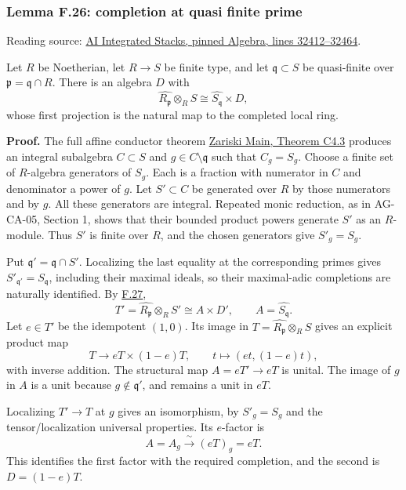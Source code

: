 \documentclass[11pt,a4paper,openany]{report}
\begin{document}
\subsubsection{Lemma F.26: completion at quasi finite prime}\label{AG-RG-S05-lemma-f.26-completion-at-quasi-finite-prime}

Reading source: \href{https://github.com/KokunoYumeto/unofficial-stacks-project-ai-drafts/blob/565b10e987aba5969b21145a0833f42d69f96790/algebra.tex\#L32412-L32464}{AI Integrated Stacks, pinned Algebra, lines 32412--32464}.

Let \(R\) be Noetherian, let \(R\to S\) be finite type, and let \(\mathfrak q\subset S\) be quasi-finite over \(\mathfrak p=\mathfrak q\cap R\). There is an algebra \(D\) with \[\widehat{R_{\mathfrak p}}\otimes_RS
\cong\widehat{S_{\mathfrak q}}\times D,\] whose first projection is the natural map to the completed local ring.

\textbf{Proof.} The full affine conductor theorem \href{https://github.com/KokunoYumeto/open-math-courses/blob/main/docs/courses/AG-RG/AG-RG-S04.md}{Zariski Main, Theorem C4.3} produces an integral subalgebra \(C\subset S\) and \(g\in C\setminus\mathfrak q\) such that \(C_g=S_g\). Choose a finite set of \(R\)-algebra generators of \(S_g\). Each is a fraction with numerator in \(C\) and denominator a power of \(g\). Let \(S'\subset C\) be generated over \(R\) by those numerators and by \(g\). All these generators are integral. Repeated monic reduction, as in AG-CA-05, Section 1, shows that their bounded product powers generate \(S'\) as an \(R\)-module. Thus \(S'\) is finite over \(R\), and the chosen generators give \(S'_g=S_g\).

Put \(\mathfrak q'=\mathfrak q\cap S'\). Localizing the last equality at the corresponding primes gives \(S'_{\mathfrak q'}=S_{\mathfrak q}\), including their maximal ideals, so their maximal-adic completions are naturally identified. By \hyperref[AG-RG-S05-algebra-lemma-completion-finite-extension]{F.27}, \[T'=\widehat{R_{\mathfrak p}}\otimes_RS'
\cong A\times D',\qquad A=\widehat{S_{\mathfrak q}}.\] Let \(e\in T'\) be the idempotent \((1,0)\). Its image in \(T=\widehat{R_{\mathfrak p}}\otimes_RS\) gives an explicit product map \[T\longrightarrow eT\times(1-e)T,\qquad t\longmapsto(et,(1-e)t),\] with inverse addition. The structural map \(A=eT'\to eT\) is unital. The image of \(g\) in \(A\) is a unit because \(g\notin\mathfrak q'\), and remains a unit in \(eT\).

Localizing \(T'\to T\) at \(g\) gives an isomorphism, by \(S'_g=S_g\) and the tensor/localization universal properties. Its \(e\)-factor is \[A=A_g\xrightarrow{\ \sim\ }(eT)_g=eT.\] This identifies the first factor with the required completion, and the second is \(D=(1-e)T\).
\end{document}

